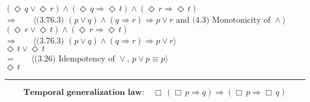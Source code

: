 \documentclass[12pt, fleqn, leqno]{article}
\newcommand{\lgap}{2pt}                             %
\newcommand{\mymathindent}{24pt}                    %
\newcommand{\equivs}{\ensuremath{\;\equiv\;}}       %
\newcommand{\impl}{\ensuremath{\Rightarrow}}        %
\newcommand{\Next}{\;\,\text{\raisebox{3.5pt}{\circle{6}}}}
\newcommand{\Event}{\Diamond\,}
\newcommand{\Always}{\Box\,}
\newcommand{\myqed}{\rule[-.23ex]{1.2ex}{2.0ex}}
\newcommand{\myqedtab}{\hspace{384pt}}              %
\newcommand{\Gll} {\langle}                         %
\newcommand{\Ggg} {\rangle}                         %
\newcommand{\Hint}[1]     {\ \ \ $\Gll              \mbox{#1} \Ggg$ }   %
\begin{document}
\begin{tabbing}
 \> \>   $(\Event q \lor \Event r) \land (\Event q \impl \Event t) \land (\Event r \impl \Event t)$\\[\lgap]
 \> $\impl$ \> \Hint{(3.76.3) $(p\lor q) \land (q \impl r)\impl p\lor r$ and (4.3) Monotonicity of $\land$} \\[\lgap]
 \> \>   $(\Event r \lor \Event t) \land (\Event r \impl \Event t)$\\[\lgap]
 \> $\impl$ \> \Hint{(3.76.3) $(p\lor q) \land (q \impl r)\impl p\lor r$} \\[\lgap]
 \> \>   $\Event t \lor \Event t$ \\[\lgap]
 \> $=$ \> \Hint{(3.26) Idempotency of $\lor$, $p \lor p \equiv p$} \\[\lgap]
 \> \>   $\Event t$ \quad \myqed
\end{tabbing}
%
%
\begin{equation}\label{E:tempGenLaw}
\textbf{Temporal generalization law:}\quad \Always (\Always p \impl q) \impl (\Always p \impl \Always q)
\end{equation}
\end{document}
